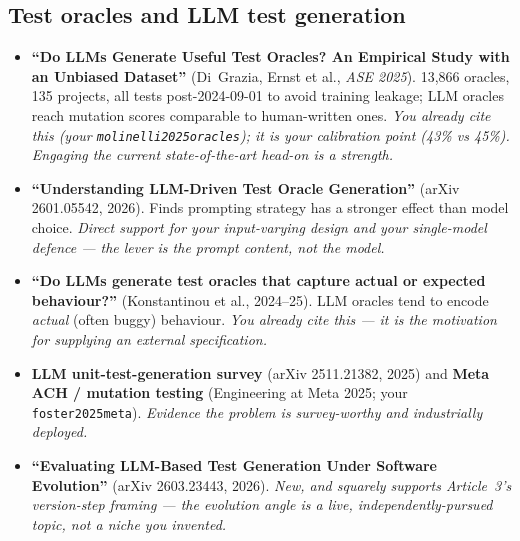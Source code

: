 \documentclass[11pt]{article}
\begin{document}
\subsection{Test oracles and LLM test generation}
\begin{itemize}[leftmargin=1.4em,itemsep=0.1em]
  \item \textbf{``Do LLMs Generate Useful Test Oracles? An Empirical Study with
        an Unbiased Dataset''} (Di~Grazia, Ernst et al., \emph{ASE 2025}).
        13{,}866 oracles, 135 projects, all tests post-2024-09-01 to avoid
        training leakage; LLM oracles reach mutation scores comparable to
        human-written ones. \emph{You already cite this (your
        \texttt{molinelli2025oracles}); it is your calibration point (43\% vs
        45\%). Engaging the current state-of-the-art head-on is a strength.}
  \item \textbf{``Understanding LLM-Driven Test Oracle Generation''}
        (arXiv 2601.05542, 2026). Finds prompting strategy has a stronger
        effect than model choice. \emph{Direct support for your input-varying
        design and your single-model defence --- the lever is the prompt
        content, not the model.}
  \item \textbf{``Do LLMs generate test oracles that capture actual or expected
        behaviour?''} (Konstantinou et al., 2024--25). LLM oracles tend to
        encode \emph{actual} (often buggy) behaviour. \emph{You already cite
        this --- it is the motivation for supplying an external specification.}
  \item \textbf{LLM unit-test-generation survey} (arXiv 2511.21382, 2025) and
        \textbf{Meta ACH / mutation testing} (Engineering at Meta 2025; your
        \texttt{foster2025meta}). \emph{Evidence the problem is survey-worthy
        and industrially deployed.}
  \item \textbf{``Evaluating LLM-Based Test Generation Under Software
        Evolution''} (arXiv 2603.23443, 2026). \emph{New, and squarely
        supports Article~3's version-step framing --- the evolution angle is a
        live, independently-pursued topic, not a niche you invented.}
\end{itemize}
\end{document}
